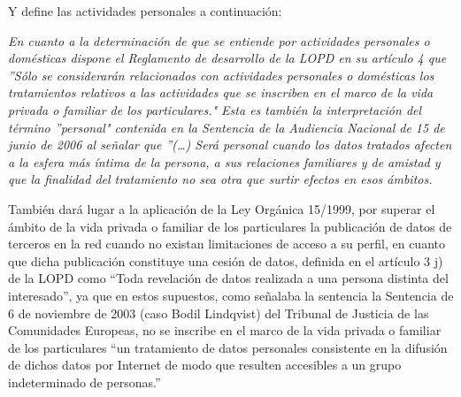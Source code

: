 Y define las actividades personales a continuación:

\begin{center}
\noindent\begin{minipage}{0.9\linewidth}%
\centering%
{\em
En cuanto a la determinación de que se entiende por actividades
personales o domésticas dispone el Reglamento de desarrollo de la LOPD en
su artículo 4 que ''Sólo se considerarán relacionados con actividades
personales o domésticas los tratamientos relativos a las actividades que se
inscriben en el marco de la vida privada o familiar de los particulares."
Esta es también la interpretación del término ''personal" contenida en la
Sentencia de la Audiencia Nacional de 15 de junio de 2006 al señalar que ''(…)
Será personal cuando los datos tratados afecten a la esfera más íntima de la
persona, a sus relaciones familiares y de amistad y que la finalidad del
tratamiento no sea otra que surtir efectos en esos ámbitos.

También dará lugar a la aplicación de la Ley Orgánica 15/1999, por
superar el ámbito de la vida privada o familiar de los particulares la publicación
de datos de terceros en la red cuando no existan limitaciones de acceso a su
perfil, en cuanto que dicha publicación constituye una cesión de datos, definida
en el artículo 3 j) de la LOPD como “Toda revelación de datos realizada a una
persona distinta del interesado”, ya que en estos supuestos, como señalaba la
sentencia la Sentencia de 6 de noviembre de 2003 (caso Bodil Lindqvist) del
Tribunal de Justicia de las Comunidades Europeas, no se inscribe en el marco
de la vida privada o familiar de los particulares “un tratamiento de datos
personales consistente en la difusión de dichos datos por Internet de modo que
resulten accesibles a un grupo indeterminado de personas.”}
\end{minipage}
\end{center}




